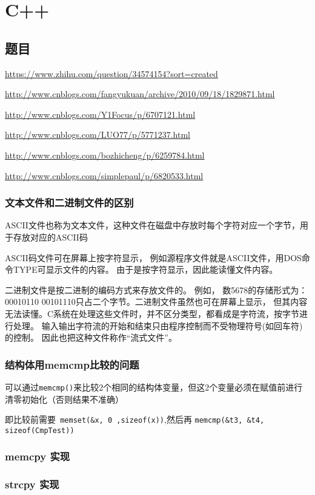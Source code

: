 \documentclass[UTF8,a4paper,8pt]{ctexart}
\begin{document}
			
\newpage
\section{C++}
	\subsection{题目}
		\url{https://www.zhihu.com/question/34574154?sort=created}
	
		\url{http://www.cnblogs.com/fangyukuan/archive/2010/09/18/1829871.html}
		
		\url{http://www.cnblogs.com/Y1Focus/p/6707121.html}
		
		\url{http://www.cnblogs.com/LUO77/p/5771237.html}
		
		\url{http://www.cnblogs.com/bozhicheng/p/6259784.html}

		\url{http://www.cnblogs.com/simplepaul/p/6820533.html}
		\subsubsection{文本文件和二进制文件的区别}
			ASCII文件也称为文本文件，这种文件在磁盘中存放时每个字符对应一个字节，用于存放对应的ASCII码
			
			ASCII码文件可在屏幕上按字符显示， 例如源程序文件就是ASCII文件，用DOS命令TYPE可显示文件的内容。 由于是按字符显示，因此能读懂文件内容。
			
			二进制文件是按二进制的编码方式来存放文件的。 例如， 数5678的存储形式为： 00010110 00101110只占二个字节。二进制文件虽然也可在屏幕上显示， 但其内容无法读懂。C系统在处理这些文件时，并不区分类型，都看成是字符流，按字节进行处理。 输入输出字符流的开始和结束只由程序控制而不受物理符号(如回车符)的控制。 因此也把这种文件称作“流式文件”。
		\subsubsection{结构体用memcmp比较的问题}
				可以通过\verb|memcmp()|来比较2个相同的结构体变量，但这2个变量必须在赋值前进行清零初始化（否则结果不准确）
				
				即比较前需要\verb| memset(&x, 0 ,sizeof(x))|,然后再 \verb|memcmp(&t3, &t4, sizeof(CmpTest))|
				
		\subsubsection{memcpy 实现}
				
		\subsubsection{strcpy 实现}
				
\end{document}
